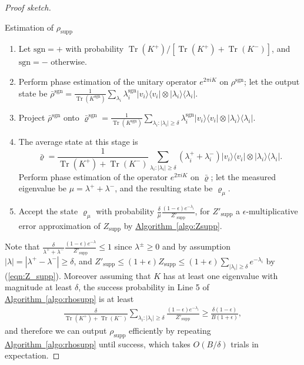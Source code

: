 \documentclass[a4paper,UKenglish,cleveref, autoref]{lipics-v2019}
\theoremstyle{remark}
\numberwithin{equation}{section}
\numberwithin{oracle}{section}
\numberwithin{remark}{section}
\newcommand{\eqn}[1]{(\ref{eqn:#1})}
\newcommand{\algo}[1]{\hyperref[algo:#1]{Algorithm~\ref*{algo:#1}}}
\newcommand{\ket}[1]{|#1\rangle}
\newcommand{\bra}[1]{\langle#1|}
\DeclareMathOperator{\tr}{Tr}
\begin{document}
\begin{proof}[Proof sketch]
\begin{algorithm}
\caption{Estimation of $\rho_{\text{supp}}$}
 \label{algo:rhosupp}
\begin{enumerate}
\item Let $\text{sgn} = +$ with probability $\tr(K^+)/[\tr(K^+)+\tr(K^-)]$, and $\text{sgn} = -$ otherwise.
\item Perform phase estimation of the unitary operator $e^{2 \pi iK}$ on $\rho^{\text{sgn}}$;  let the output state be $\bar{\rho}^{\text{sgn}}=\frac{1}{ \tr(K^{\text{sgn}})}\sum_{\lambda_i} \lambda^{\text{sgn}}_i \ket{v_i}\bra{v_i}\otimes\ket{\lambda_i}\bra{\lambda_i}$.
\item Project $\bar\rho^{\text{sgn}}$ onto $\bar\varrho^{\text{sgn}}=\frac{1}{ \tr(K^{\text{sgn}})}\sum_{\lambda_i:|\lambda_i|\ge\delta} \lambda^{\text{sgn}}_i \ket{v_i}\bra{v_i}\otimes\ket{\lambda_i}\bra{\lambda_i}$.
\item The average state at this stage is
$$
\bar\varrho=\frac{1}{\tr(K^+)+\tr(K^-)}\sum_{\lambda_i:|\lambda_i|\ge\delta} (\lambda^+_i + \lambda^-_i) \ket{v_i}\bra{v_i}\otimes\ket{\lambda_i}\bra{\lambda_i}.
$$
Perform phase estimation of the operator $e^{2\pi iK}$ on $\bar\varrho$; let the measured eigenvalue be $\mu=\lambda^+ + \lambda^-$, and the resulting state be ${\varrho}_{\mu}$.
\item Accept the state ${\varrho}_{\mu}$ with probability $\frac{\delta}{\mu}\frac{(1-\epsilon)e^{-{\lambda_i}}}{Z'_{\text{supp}}}$, for $Z'_{\text{supp}}$ a $\epsilon$-multiplicative error approximation of $Z_{\text{supp}}$ by \algo{Zsupp}.
\end{enumerate}
\end{algorithm}
Note that $\frac{\delta}{{\lambda}^+ +{\lambda}^-}\frac{(1-\epsilon)e^{-{\lambda}}}{Z'_{\text{supp}}} \le 1$ since $\lambda^\pm\ge0$ and by assumption $|\lambda|=|\lambda^+ -\lambda^-|\ge \delta$, and $Z'_{\text{supp}} \leq (1+\epsilon)Z_{\text{supp}} \leq (1+\epsilon)\sum_{|\lambda_i| \ge \delta} e^{-\lambda_i}$ by \eqn{Z_supp}. Moreover assuming that $K$ has at least one eigenvalue with magnitude at least $\delta$, the success probability in Line 5 of \algo{rhosupp} is at least
\begin{align}\label{eqn:Z_supp-prob}
\frac{\delta}{\tr(K^+)+\tr(K^-)}\sum_{\lambda_i:|\lambda_i|\ge\delta} \frac{(1-\epsilon)e^{-\lambda_i}}{Z'_{\text{supp}}} \geq \frac{\delta(1-\epsilon)}{B(1+\epsilon)},
\end{align}
and therefore we can output $\rho_{\text{supp}}$ efficiently by repeating \algo{rhosupp} until success, which takes $O(B/\delta)$ trials in expectation.


\end{proof}
\end{document}
